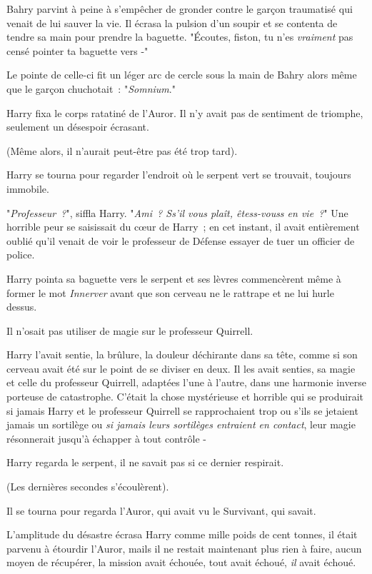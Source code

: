 Bahry parvint à peine à s'empêcher de gronder contre le garçon traumatisé qui venait de lui sauver la vie. Il écrasa la pulsion d'un soupir et se contenta de tendre sa main pour prendre la baguette. "Écoutes, fiston, tu n'es \emph{vraiment} pas censé pointer ta baguette vers -"

Le pointe de celle-ci fit un léger arc de cercle sous la main de Bahry alors même que le garçon chuchotait~: "\emph{Somnium}."

\later

Harry fixa le corps ratatiné de l'Auror. Il n'y avait pas de sentiment de triomphe, seulement un désespoir écrasant.

(Même alors, il n'aurait peut-être pas été trop tard).

Harry se tourna pour regarder l'endroit où le serpent vert se trouvait, toujours immobile.

"\emph{Professeur~?}", siffla Harry. "\emph{Ami~? Ss'il vous plaît, êtess-vouss en vie~?}" Une horrible peur se saisissait du cœur de Harry~; en cet instant, il avait entièrement oublié qu'il venait de voir le professeur de Défense essayer de tuer un officier de police.

Harry pointa sa baguette vers le serpent et ses lèvres commencèrent même à former le mot \emph{Innerver} avant que son cerveau ne le rattrape et ne lui hurle dessus.

Il n'osait pas utiliser de magie sur le professeur Quirrell.

Harry l'avait sentie, la brûlure, la douleur déchirante dans sa tête, comme si son cerveau avait été sur le point de se diviser en deux. Il les avait senties, sa magie et celle du professeur Quirrell, adaptées l'une à l'autre, dans une harmonie inverse porteuse de catastrophe. C'était la chose mystérieuse et horrible qui se produirait si jamais Harry et le professeur Quirrell se rapprochaient trop ou s'ils se jetaient jamais un sortilège ou \emph{si jamais leurs sortilèges entraient en contact}, leur magie résonnerait jusqu'à échapper à tout contrôle -

Harry regarda le serpent, il ne savait pas si ce dernier respirait.

(Les dernières secondes s'écoulèrent).

Il se tourna pour regarda l'Auror, qui avait vu le Survivant, qui savait.

L'amplitude du désastre écrasa Harry comme mille poids de cent tonnes, il était parvenu à étourdir l'Auror, mails il ne restait maintenant plus rien à faire, aucun moyen de récupérer, la mission avait échouée, tout avait échoué, \emph{il} avait échoué.


